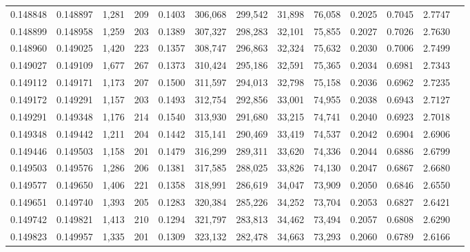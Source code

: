 \begin{tabular}{rrrrrrrrrrrrr}
0.148848 & 0.148897 & 1,281 & 209 &                                     0.1403 & 306,068 & 299,542 &  31,898 &  76,058 & 0.2025 & 0.7045 & 2.7747 \\
0.148899 & 0.148958 & 1,259 & 203 &                                     0.1389 & 307,327 & 298,283 &  32,101 &  75,855 & 0.2027 & 0.7026 & 2.7630 \\
0.148960 & 0.149025 & 1,420 & 223 &                                     0.1357 & 308,747 & 296,863 &  32,324 &  75,632 & 0.2030 & 0.7006 & 2.7499 \\
0.149027 & 0.149109 & 1,677 & 267 &                                     0.1373 & 310,424 & 295,186 &  32,591 &  75,365 & 0.2034 & 0.6981 & 2.7343 \\
0.149112 & 0.149171 & 1,173 & 207 &                                     0.1500 & 311,597 & 294,013 &  32,798 &  75,158 & 0.2036 & 0.6962 & 2.7235 \\
0.149172 & 0.149291 & 1,157 & 203 &                                     0.1493 & 312,754 & 292,856 &  33,001 &  74,955 & 0.2038 & 0.6943 & 2.7127 \\
0.149291 & 0.149348 & 1,176 & 214 &                                     0.1540 & 313,930 & 291,680 &  33,215 &  74,741 & 0.2040 & 0.6923 & 2.7018 \\
0.149348 & 0.149442 & 1,211 & 204 &                                     0.1442 & 315,141 & 290,469 &  33,419 &  74,537 & 0.2042 & 0.6904 & 2.6906 \\
0.149446 & 0.149503 & 1,158 & 201 &                                     0.1479 & 316,299 & 289,311 &  33,620 &  74,336 & 0.2044 & 0.6886 & 2.6799 \\
0.149503 & 0.149576 & 1,286 & 206 &                                     0.1381 & 317,585 & 288,025 &  33,826 &  74,130 & 0.2047 & 0.6867 & 2.6680 \\
0.149577 & 0.149650 & 1,406 & 221 &                                     0.1358 & 318,991 & 286,619 &  34,047 &  73,909 & 0.2050 & 0.6846 & 2.6550 \\
0.149651 & 0.149740 & 1,393 & 205 &                                     0.1283 & 320,384 & 285,226 &  34,252 &  73,704 & 0.2053 & 0.6827 & 2.6421 \\
0.149742 & 0.149821 & 1,413 & 210 &                                     0.1294 & 321,797 & 283,813 &  34,462 &  73,494 & 0.2057 & 0.6808 & 2.6290 \\
0.149823 & 0.149957 & 1,335 & 201 &                                     0.1309 & 323,132 & 282,478 &  34,663 &  73,293 & 0.2060 & 0.6789 & 2.6166 \\

\end{tabular}
